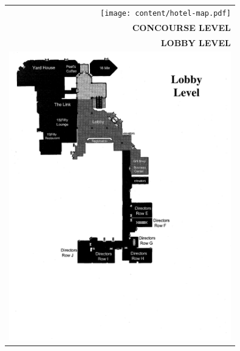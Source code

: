 
\thispagestyle{empty}
\begin{center}
  \begin{tabular}{r}
    \texttt{[image: content/hotel-map.pdf]} \\
    \textbf{CONCOURSE LEVEL}\\\hline
    \textbf{LOBBY LEVEL}\\
    \includegraphics[width=3.8in]{content/hotel-map-2.pdf}
  \end{tabular}
\end{center}
